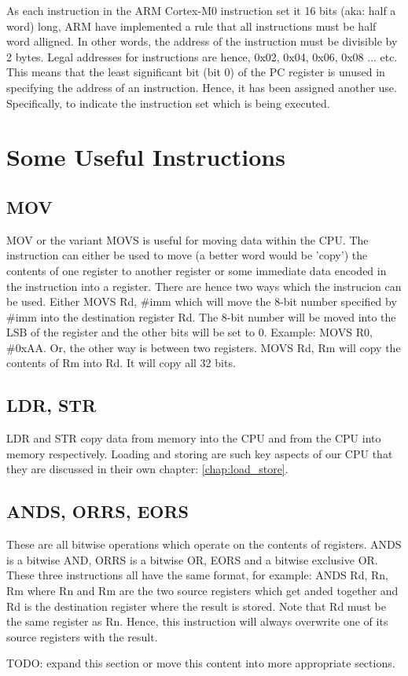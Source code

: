 As each instruction in the ARM Cortex-M0 instruction set it 16 bits (aka: half a word) long, ARM have implemented a rule that all instructions must be half word alligned. In other words, the address of the instruction must be divisible by 2 bytes. Legal addresses for instructions are hence, 0x02, 0x04, 0x06, 0x08 ... etc. 
This means that the least significant bit (bit 0) of the PC register is unused in specifying the address of an instruction. 
Hence, it has been assigned another use. Specifically, to indicate the instruction set which is being executed. 

\section{Some Useful Instructions}
\subsection{MOV}
MOV or the variant MOVS is useful for moving data within the CPU. The instruction can either be used to move (a better word would be 'copy') the contents of one register to another register or some immediate data encoded in the instruction into a register. There are hence two ways which the instrucion can be used. Either MOVS Rd, \#imm which will move the 8-bit number specified by \#imm into the destination register Rd. The 8-bit number will be moved into the LSB of the register and the other bits will be set to 0. Example: MOVS R0, \#0xAA. Or, the other way is between two registers. MOVS Rd, Rm will copy the contents of Rm into Rd. It will copy all 32 bits.

\subsection{LDR, STR}
LDR and STR copy data from memory into the CPU and from the CPU into memory respectively. Loading and storing are such key aspects of our CPU that they are discussed in their own chapter: \autoref{chap:load_store}.

\subsection{ANDS, ORRS, EORS}
These are all bitwise operations which operate on the contents of registers. ANDS is a bitwise AND, ORRS is a bitwise OR, EORS and a bitwise exclusive OR. These three instructions all have the same format, for example: ANDS Rd, Rn, Rm where Rn and Rm are the two source registers which get anded together and Rd is the destination register where the result is stored. Note that Rd must be the same register as Rn. Hence, this instruction will always overwrite one of its source registers with the result.

TODO: expand this section or move this content into more appropriate sections.
